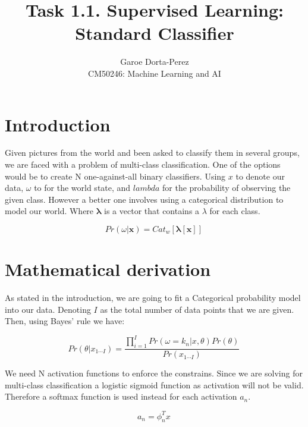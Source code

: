 \documentclass[12pt]{article}
\begin{document}
  
\title{Task 1.1. Supervised Learning: Standard Classifier}
\author{Garoe Dorta-Perez\\
CM50246: Machine Learning and AI}
 
\maketitle
 
\section{Introduction}
 
Given pictures from the world and been asked to classify them in several groups, we are faced with a problem of multi-class classification.
One of the options would be to create N one-against-all binary classifiers. Using $x$ to denote our data, $\omega$ to for the world state, and $lambda$ for the probability of observing the given class. However a better one involves using a categorical distribution to model our world. Where $\bm{\lambda}$ is a vector that contains a $\lambda$ for each class.

\begin{equation}
\label{categoricalDistribution}
Pr(\omega|\mathbf{x}) = Cat_{w}[\bm{\lambda}[\mathbf{x}]]\,
\end{equation}

\section{Mathematical derivation}

As stated in the introduction, we are going to fit a Categorical probability model into our data. 
Denoting $I$ as the total number of data points that we are given.  
Then, using Bayes' rule we have:

\begin{equation}
\label{bayes}
Pr(\theta | x_{1 \cdots I}) = \frac{\prod_{i = 1}^{I} Pr(\omega = k_{n} | x, \theta) Pr(\theta)} {Pr(x_{1 \cdots I})}\,
\end{equation}

We need N activation functions to enforce the constrains.
Since we are solving for multi-class classification a logistic sigmoid function as activation will not be valid.
Therefore a softmax function is used instead for each activation $a_{n}$.

\begin{equation}
\label{activations}
a_{n} = \phi_{n}^{T}x\,
\end{equation}
\end{document}
